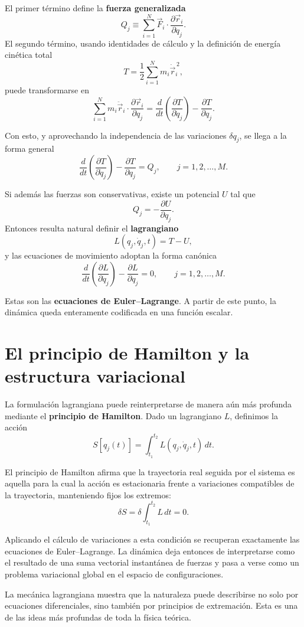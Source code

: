 El primer término define la \textbf{fuerza generalizada}
\[
Q_j \equiv \sum_{i=1}^{N} \vec{F}_i\cdot\frac{\partial\vec{r}_i}{\partial q_j}.
\]
El segundo término, usando identidades de cálculo y la definición de energía cinética total
\[
T = \frac{1}{2}\sum_{i=1}^{N} m_i\dot{\vec{r}}_i^{\,2},
\]
puede transformarse en
\[
\sum_{i=1}^{N}m_i\ddot{\vec{r}}_i\cdot\frac{\partial\vec{r}_i}{\partial q_j}
=
\frac{d}{dt}\left(\frac{\partial T}{\partial \dot{q}_j}\right)-\frac{\partial T}{\partial q_j}.
\]

Con esto, y aprovechando la independencia de las variaciones \(\delta q_j\), se llega a la forma general
\[
\frac{d}{dt}\left(\frac{\partial T}{\partial \dot{q}_j}\right)-\frac{\partial T}{\partial q_j}=Q_j,
\qquad j=1,2,\dots,M.
\]

Si además las fuerzas son conservativas, existe un potencial \(U\) tal que
\[
Q_j = -\frac{\partial U}{\partial q_j}.
\]
Entonces resulta natural definir el \textbf{lagrangiano}
\[
L(q_j,\dot{q}_j,t)=T-U,
\]
y las ecuaciones de movimiento adoptan la forma canónica
\[
\frac{d}{dt}\left(\frac{\partial L}{\partial \dot{q}_j}\right)-\frac{\partial L}{\partial q_j}=0,
\qquad j=1,2,\dots,M.
\]

Estas son las \textbf{ecuaciones de Euler--Lagrange}. A partir de este punto, la dinámica queda enteramente codificada en una función escalar.

\section{El principio de Hamilton y la estructura variacional}
La formulación lagrangiana puede reinterpretarse de manera aún más profunda mediante el \textbf{principio de Hamilton}. Dado un lagrangiano \(L\), definimos la acción
\[
S[q_j(t)] = \int_{t_1}^{t_2} L(q_j,\dot{q}_j,t)\,dt.
\]

El principio de Hamilton afirma que la trayectoria real seguida por el sistema es aquella para la cual la acción es estacionaria frente a variaciones compatibles de la trayectoria, manteniendo fijos los extremos:
\[
\delta S = \delta\int_{t_1}^{t_2}L\,dt = 0.
\]

Aplicando el cálculo de variaciones a esta condición se recuperan exactamente las ecuaciones de Euler--Lagrange. La dinámica deja entonces de interpretarse como el resultado de una suma vectorial instantánea de fuerzas y pasa a verse como un problema variacional global en el espacio de configuraciones.

\begin{importante}
La mecánica lagrangiana muestra que la naturaleza puede describirse no solo por ecuaciones diferenciales, sino también por principios de extremación. Esta es una de las ideas más profundas de toda la física teórica.
\end{importante}

